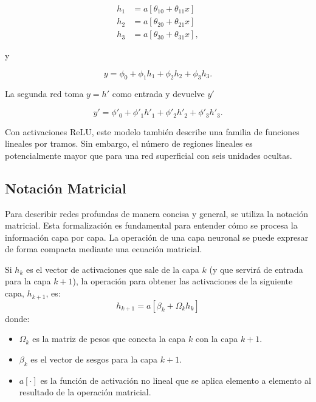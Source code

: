 \begin{align}
    h_1 &= a[\theta_{10} + \theta_{11}x] \\
    h_2 &= a[\theta_{20} + \theta_{21}x] \\
    h_3 &= a[\theta_{30} + \theta_{31}x],
    \label{eq:deep_h1}
\end{align}

y

\begin{equation}
    y = \phi_0 + \phi_1h_1 + \phi_2h_2 + \phi_3h_3.
    \label{eq:deep_y1}
\end{equation}

La segunda red toma $y = h'$ como entrada y devuelve $y'$

\begin{equation}
    y' = \phi'_0 + \phi'_1h'_1 + \phi'_2h'_2 + \phi'_3h'_3.
    \label{eq:deep_yprime}
\end{equation}

Con activaciones ReLU, este modelo también describe una familia de funciones lineales por tramos. Sin embargo, el número de regiones lineales es potencialmente mayor que para una red superficial con seis unidades ocultas. 

\subsection{Notación Matricial}

Para describir redes profundas de manera concisa y general, se utiliza la notación matricial. Esta formalización es fundamental para entender cómo se procesa la información capa por capa. La operación de una capa neuronal se puede expresar de forma compacta mediante una ecuación matricial.

Si $h_k$ es el vector de activaciones que sale de la capa $k$ (y que servirá de entrada para la capa $k+1$), la operación para obtener las activaciones de la siguiente capa, $h_{k+1}$, es:
\begin{equation}
h_{k+1} = a[\beta_k + \Omega_k h_k]
\end{equation}
donde:
\begin{itemize}
    \item $\Omega_k$ es la matriz de pesos que conecta la capa $k$ con la capa $k+1$.
    \item $\beta_k$ es el vector de sesgos para la capa $k+1$.
    \item $a[\cdot]$ es la función de activación no lineal que se aplica elemento a elemento al resultado de la operación matricial.
\end{itemize}

